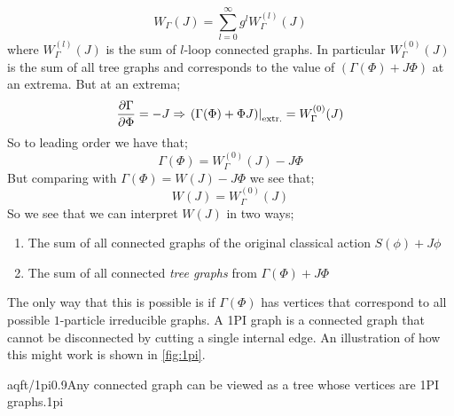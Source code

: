 \begin{equation}
W_{\Gamma}(J) = \sum_{l = 0}^{\infty}{g^{l}W_{\Gamma}^{(l)}(J)}
\end{equation}
where $W_{\Gamma}^{(l)}(J)$ is the sum of $l$-loop connected graphs. In particular $W_{\Gamma}^{(0)}(J)$ is the sum of all tree graphs and corresponds to the value of $\left(\Gamma(\Phi) + J\Phi\right)$ at an extrema. But at an extrema;
\begin{equation*}
\frac{\del \Gamma}{\del \Phi} = - J \Rightarrow \left.\left(\Gamma(\Phi) + \Phi J\right)\right|_{\text{extr.}} = W_{\Gamma}^{(0)}(J)
\end{equation*}
So to leading order we have that;
\begin{equation*}
\Gamma(\Phi) = W_{\Gamma}^{(0)}(J) - J\Phi
\end{equation*}
But comparing with $\Gamma(\Phi) = W(J) - J\Phi$ we see that;
\begin{equation}
W(J) = W_{\Gamma}^{(0)}(J)
\end{equation}
So we see that we can interpret $W(J)$ in two ways;
\begin{enumerate}
\item The sum of all connected graphs of the original classical action $S(\phi) + J\phi$
\item The sum of all connected \emph{tree graphs} from $\Gamma(\Phi) + J\Phi$
\end{enumerate}
The only way that this is possible is if $\Gamma(\Phi)$ has vertices that correspond to all possible $1$-particle irreducible graphs. A 1PI graph is a connected graph that cannot be disconnected by cutting a single internal edge. An illustration of how this might work is shown in \autoref{fig:1pi}.
\begin{mygraphic}{aqft/1pi}{0.9}{Any connected graph can be viewed as a tree whose vertices are 1PI graphs.}{1pi}\end{mygraphic}
